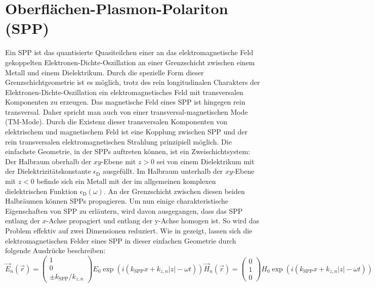 \documentclass[a4paper, titlepage,  ngerman]{book}
\begin{document}
	\section{Oberflächen-Plasmon-Polariton (SPP)}
	\label{sec:spp}		
	Ein SPP ist das quantisierte Quasiteilchen einer an das elektromagnetische Feld gekoppelten Elektronen-Dichte-Oszillation an einer Grenzschicht zwischen einem Metall und einem Dielektrikum. Durch die spezielle Form dieser Grenzschichtgeometrie ist es möglich, trotz des rein longitudinalen Charakters der Elektronen-Dichte-Oszillation ein elektromagnetisches Feld mit transversalen Komponenten zu erzeugen. Das magnetische Feld eines SPP ist hingegen rein transversal. Daher spricht man auch von einer transversal-magnetischen Mode (TM-Mode). Durch die Existenz dieser transversalen Komponenten von elektrischem und magnetischem Feld ist eine Kopplung zwischen SPP und der rein transversalen elektromagnetischen Strahlung prinzipiell möglich. Die einfachste Geometrie, in der SPPs auftreten können, ist ein Zweischichtsystem: Der Halbraum oberhalb der $xy$-Ebene mit $z>0$ sei von einem Dielektrikum mit der Dielektrizitätskonstante $\epsilon_\mathrm{D}$ ausgefüllt. Im Halbraum unterhalb der $xy$-Ebene mit $z<0$ befinde sich ein Metall mit der im allgemeinen komplexen dielektrischen Funktion $\epsilon_\mathrm{D}(\omega)$. An der Grenzschicht zwischen diesen beiden Halbräumen können SPPs propagieren. Um nun einige charakteristische Eigenschaften von SPP zu erläutern, wird davon ausgegangen, dass das SPP entlang der $x$-Achse propagiert und entlang der y-Achse homogen ist. So wird das Problem effektiv auf zwei Dimensionen reduziert. Wie in \cite{Maier.2007} gezeigt, lassen sich die elektromagnetischen Felder eines SPP in dieser einfachen Geometrie durch folgende Ausdrücke beschreiben:
	\begin{subequations}
		\label{eq:fields_spp}
		\begin{equation}
			\label{eq:electric_field_spp}
			\vec{E}_n(\vec{r}) = \begin{pmatrix} 1 \\ 0 \\ \pm k_{\mathrm{SPP}}/k_{z,n} \end{pmatrix} E_0 \exp\left(i(k_{\mathrm{SPP}}x + k_{z, n}|z|-\omega t)\right)	
		\end{equation}
		\begin{equation}
			\label{eq:magnetic_field_spp}
			\vec{H}_n(\vec{r}) = \begin{pmatrix} 0 \\ 1 \\ 0 \end{pmatrix} H_0 \exp\left(i(k_{\mathrm{SPP}}x + k_{z, n}|z|-\omega t)\right)
		\end{equation}
	\end{subequations}
\end{document}
